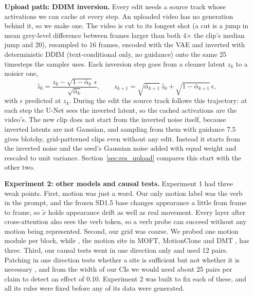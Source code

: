 \documentclass[twoside,english]{article}
\newcommand{\xd}{\tilde{x}}       %
\begin{document}
\textbf{Upload path: DDIM inversion.} Every edit needs a source track whose activations we can cache at
every step. An uploaded video has no generation behind it, so we make one. The video is cut to its
longest shot (a cut is a jump in mean grey-level difference between frames larger than both 4$\times$
the clip's median jump and 20), resampled to 16 frames, encoded with the VAE and inverted with
deterministic DDIM (text-conditional only, no guidance) onto the same 25 timesteps the sampler uses. Each
inversion step goes from a cleaner latent $z_k$ to a noisier one,
\begin{equation}
\hat z_0 = \frac{z_k - \sqrt{1-\bar\alpha_k}\,\epsilon}{\sqrt{\bar\alpha_k}}, \qquad
z_{k+1} = \sqrt{\bar\alpha_{k+1}}\,\hat z_0 + \sqrt{1-\bar\alpha_{k+1}}\,\epsilon,
\end{equation}
with $\epsilon$ predicted at $z_k$. During the edit the source track follows this trajectory: at each step
the U-Net sees the inverted latent, so the cached activations are the video's. The new clip does not
start from the inverted noise itself, because inverted latents are not Gaussian, and sampling from them
with guidance 7.5 gives blotchy, grid-patterned clips even without any edit. Instead it starts from the
inverted noise and the seed's Gaussian noise added with equal weight and rescaled to unit variance.
Section~\ref{sec:res_upload} compares this start with the other two.

\textbf{Experiment 2: other models and causal tests.} Experiment 1 had three weak points. First, motion
was just a word. Our only motion label was the verb in the prompt, and the frozen SD1.5 base changes
appearance a little from frame to frame, so $\xd$ holds appearance drift as well as real movement. Every
layer after cross-attention also sees the verb token, so a verb probe can succeed without any motion
being represented. Second, our grid was coarse. We probed one motion module per block, while
, the motion site in MOFT, MotionClone and DMT \citep{yatim2024dmt}, has three. Third,
our causal tests went in one direction only and used 12 pairs. Patching in one direction tests whether
a site is sufficient but not whether it is necessary \citep{heimersheim2024patching}, and from the width
of our CIs we would need about 25 pairs per claim to detect an effect of 0.10. Experiment 2 was built to
fix each of these, and all its rules were fixed before any of its data were generated.
\end{document}
